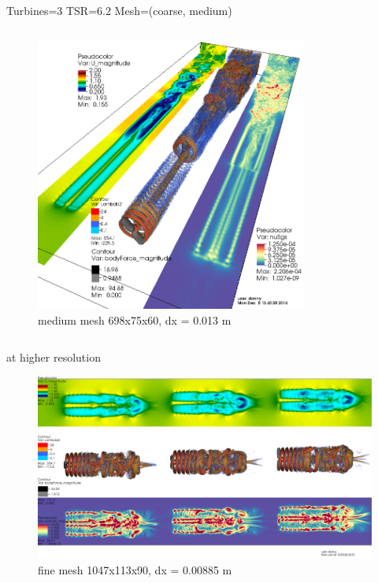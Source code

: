 \documentclass[xcolor=x11names,compress]{beamer}
\begin{document}
\begin{frame}{Turbines=3  TSR=6.2  Mesh=(coarse, medium)}
\begin{columns}
		    \begin{column}{0.6\textwidth}
		        \begin{figure}[p]
				    \centering
				    \includegraphics[width=0.8\textwidth]{figures/fastFlume__Turbines=3_TSR=6p2_Layout=offset_Mesh=medium.png}
				    \caption{\scriptsize{medium mesh 698x75x60, dx = 0.013 m}}
				\end{figure}

		    \end{column}

		\end{columns}

	\end{frame}


	\begin{frame}{at higher resolution}

		\begin{figure}[p]
		    \centering
    		\includegraphics[width=1.05\textwidth]{figures/fastFlume__Turbines=3_TSR=6p2_Layout=offset_Mesh=fine.png}
		    \caption{\scriptsize{fine mesh 1047x113x90, dx = 0.00885 m}}
		\end{figure}

	\end{frame}
\end{document}
